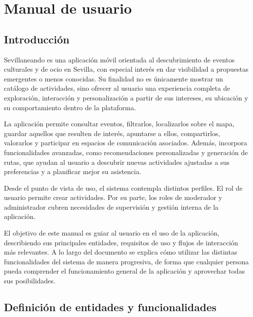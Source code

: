 \chapter{Manual de usuario}\label{cap:manual_usuario}

\section{Introducción}

Sevillaneando es una aplicación móvil orientada al descubrimiento de eventos culturales y de ocio en Sevilla, con especial interés en dar visibilidad a propuestas emergentes o menos conocidas. Su finalidad no es únicamente mostrar un catálogo de actividades, sino ofrecer al usuario una experiencia completa de exploración, interacción y personalización a partir de sus intereses, su ubicación y su comportamiento dentro de la plataforma.

La aplicación permite consultar eventos, filtrarlos, localizarlos sobre el mapa, guardar aquellos que resulten de interés, apuntarse a ellos, compartirlos, valorarlos y participar en espacios de comunicación asociados. Además, incorpora funcionalidades avanzadas, como recomendaciones personalizadas y generación de rutas, que ayudan al usuario a descubrir nuevas actividades ajustadas a sus preferencias y a planificar mejor su asistencia.

Desde el punto de vista de uso, el sistema contempla distintos perfiles. El rol de usuario permite crear actividades. Por su parte, los roles de moderador y administrador cubren necesidades de supervisión y gestión interna de la aplicación.

El objetivo de este manual es guiar al usuario en el uso de la aplicación, describiendo sus principales entidades, requisitos de uso y flujos de interacción más relevantes. A lo largo del documento se explica cómo utilizar las distintas funcionalidades del sistema de manera progresiva, de forma que cualquier persona pueda comprender el funcionamiento general de la aplicación y aprovechar todas sus posibilidades.

\section{Definición de entidades y funcionalidades}

